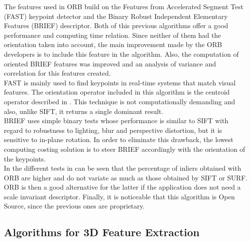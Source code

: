 The features used in ORB build on the Features from Accelerated Segment Test (FAST)\cite{fast} keypoint detector and the Binary Robust Independent Elementary Features (BRIEF)\cite{brief} descriptor. Both of this previous algorithms offer a good performance and computing time relation. Since neither of them had the orientation taken into account, the main improvement made by the ORB developers is to include this feature in the algorithm. Also, the computation of oriented BRIEF features was improved and an analysis of variance and correlation for this features created. 
\\

FAST is mainly used to find keypoints in real-time systems that match visual features. The orientation operator included in this algorithm is the centroid operator described in \cite{orientation_corners}. This technique is not computationally demanding and also, unlike SIFT, it returns a single dominant result. 
\\

BRIEF uses simple binary tests whose performance is similar to SIFT with regard to robustness to lighting, blur and perspective distortion, but it is sensitive to in-plane rotation. In order to eliminate this drawback, the lowest computing costing solution is to steer BRIEF accordingly with the orientation of the keypoints. 
\\

In the different tests in \cite{orb} can be seen that the percentage of inliers obtained with ORB are higher and do not variate as much as those obtained by SIFT or SURF. 
ORB is then a good alternative for the latter if the application does not need a scale invariant descriptor. 
Finally, it is noticeable that this algorithm is Open Source, since the previous ones are proprietary. 


\subsection{Algorithms for 3D Feature Extraction}
\label{3d_features}


